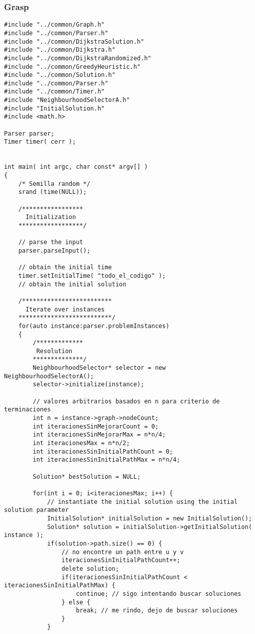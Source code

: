 \subsubsection{Grasp}


\begin{lstlisting}[caption=grasp.cpp]
#include "../common/Graph.h"
#include "../common/Parser.h"
#include "../common/DijkstraSolution.h"
#include "../common/Dijkstra.h"
#include "../common/DijkstraRandomized.h"
#include "../common/GreedyHeuristic.h"
#include "../common/Solution.h"
#include "../common/Parser.h"
#include "../common/Timer.h"
#include "NeighbourhoodSelectorA.h"
#include "InitialSolution.h"
#include <math.h>

Parser parser;
Timer timer( cerr );


int main( int argc, char const* argv[] ) 
{
    /* Semilla random */
    srand (time(NULL));

    /*****************
      Initialization
    ******************/
            
    // parse the input
    parser.parseInput();  

    // obtain the initial time
    timer.setInitialTime( "todo_el_codigo" );
    // obtain the initial solution

    /*************************
      Iterate over instances
    **************************/
    for(auto instance:parser.problemInstances)
    {        
        /*************
         Resolution
        **************/           
        NeighbourhoodSelector* selector = new NeighbourhoodSelectorA();
        selector->initialize(instance);                        

        // valores arbitrarios basados en n para criterio de terminaciones
        int n = instance->graph->nodeCount;
        int iteracionesSinMejorarCount = 0;
        int iteracionesSinMejorarMax = n*n/4;
        int iteracionesMax = n*n/2;
        int iteracionesSinInitialPathCount = 0;
        int iteracionesSinInitialPathMax = n*n/4;
        
        Solution* bestSolution = NULL;            

        for(int i = 0; i<iteracionesMax; i++) {              
            // instantiate the initial solution using the initial solution parameter
            InitialSolution* initialSolution = new InitialSolution();              
            Solution* solution = initialSolution->getInitialSolution( instance );                     
            if(solution->path.size() == 0) {
                // no encontre un path entre u y v
                iteracionesSinInitialPathCount++;
                delete solution;            
                if(iteracionesSinInitialPathCount < iteracionesSinInitialPathMax) {
                    continue; // sigo intentando buscar soluciones
                } else {
                    break; // me rindo, dejo de buscar soluciones
                }            
            }                        


\end{lstlisting}
